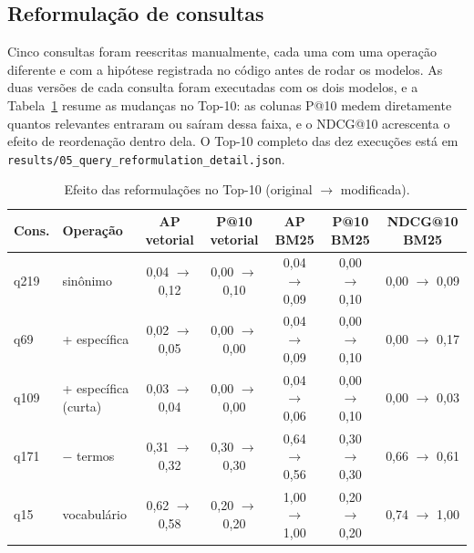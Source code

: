 \documentclass[10pt,twocolumn,a4paper]{article}
\begin{document}
\subsection{Reformulação de consultas}
\label{sec:reform}

Cinco consultas foram reescritas manualmente, cada uma com uma operação diferente
e com a hipótese registrada no código antes de rodar os modelos. As duas versões
de cada consulta foram executadas com os dois modelos, e a
Tabela~\ref{tab:reform} resume as mudanças no Top-10: as colunas P@10 medem
diretamente quantos relevantes entraram ou saíram dessa faixa, e o NDCG@10
acrescenta o efeito de reordenação dentro dela. O Top-10 completo das dez
execuções está em \texttt{results/05\_query\_reformulation\_detail.json}.

\begin{table}[htbp]
\centering
\small
\setlength{\tabcolsep}{9pt}
\begin{tabular}{@{}llccccc@{}}
\toprule
\textbf{Cons.} & \textbf{Operação} & \textbf{AP vetorial} & \textbf{P@10 vetorial} &
\textbf{AP BM25} & \textbf{P@10 BM25} & \textbf{NDCG@10 BM25}\\
\midrule
q219 & sinônimo              & 0,04 $\to$ 0,12 & 0,00 $\to$ 0,10 & 0,04 $\to$ 0,09 & 0,00 $\to$ 0,10 & 0,00 $\to$ 0,09\\
q69  & + específica          & 0,02 $\to$ 0,05 & 0,00 $\to$ 0,00 & 0,04 $\to$ 0,09 & 0,00 $\to$ 0,10 & 0,00 $\to$ 0,17\\
q109 & + específica (curta)  & 0,03 $\to$ 0,04 & 0,00 $\to$ 0,00 & 0,04 $\to$ 0,06 & 0,00 $\to$ 0,10 & 0,00 $\to$ 0,03\\
q171 & $-$ termos            & 0,31 $\to$ 0,32 & 0,30 $\to$ 0,30 & 0,64 $\to$ 0,56 & 0,30 $\to$ 0,30 & 0,66 $\to$ 0,61\\
q15  & vocabulário           & 0,62 $\to$ 0,58 & 0,20 $\to$ 0,20 & 1,00 $\to$ 1,00 & 0,20 $\to$ 0,20 & 0,74 $\to$ 1,00\\
\bottomrule
\end{tabular}
\caption{Efeito das reformulações no Top-10 (original $\to$ modificada).}
\label{tab:reform}
\end{table}
\end{document}
